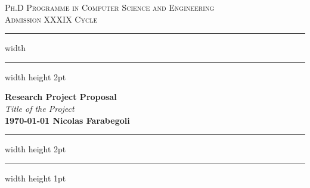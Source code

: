 \documentclass[12pt]{article}
\begin{document}
\begin{titlepage}
	\centering

	\textsc{\Large Ph.D Programme in Computer Science and Engineering}\\[0.5cm]
	\textsc{\Large Admission XXXIX Cycle}\\[0.6cm]

	\hrule width \hsize \kern 1mm \hrule width \hsize height 2pt
	\vspace{0.8cm}

	{\large \bfseries Research Project Proposal}\\[0.6cm]
	{\large \emph{Title of the Project}}\\[0.6cm]

	{\bfseries{\monthyeardate\today} \hfill \bfseries{Nicolas Farabegoli}}\\[0.6cm]

	\hrule width \hsize height 2pt \kern 1mm \hrule width \hsize height 1pt
	\vspace{0.4cm}

	\begin{abstract}
		In recent years,
		the emergence of \ac{cps} has engendered a noteworthy surge in complexity and heterogeneity
		within the underlying infrastructure supporting these systems.
		Notably, the interplay between cloud, fog, and edge computing exemplifies the intricacy inherent in such systems.
		Modern collective adaptive applications like \ac{iot}, human enhanced by wearable devices,
		swarm robotics, smart cities,
		are designed to be executed on several devices and to be deployed in
		heterogeneous infrastructures, ranging from cloud servers to wearable devices.
		The availability of such a wide range of devices and infrastructures opens from one side
		better exploitation of the available resources and performance,
		but on the other side,
		it introduces complexity in the design and deployment of such applications.
		This research project proposes to produce a framework for the design and deployment of
		collective adaptive applications on heterogeneous infrastructures.
		Reconfiguration aspects will be considered,
		allowing the application to adapt to the changes in the infrastructure and external conditions.
		The framework can leverage machine learning techniques to manage the complex task of reconfiguration
		to opportunistically balance the performance and energy consumption.
		Since the \ac{iot} consists of a large number of devices,
		they produce a large amount of data from extremely scattered data sources.
		The management of such data is a complex and delicate task,
		which will be addressed with state-of-the-art techniques.
	\end{abstract}
\end{titlepage}
\end{document}
